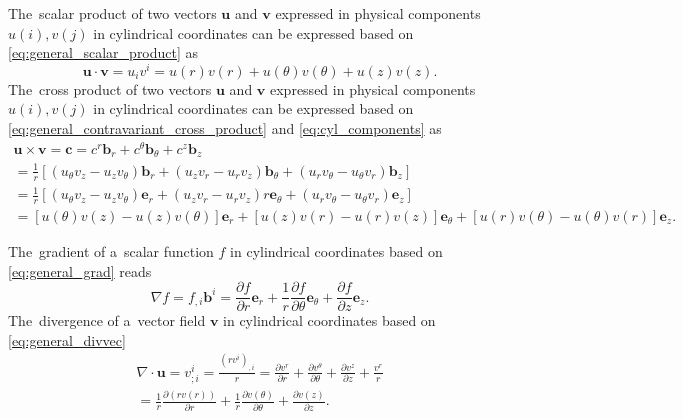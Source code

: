 \documentclass[preprint,12pt]{elsarticle}
\newcommand{\pdv}[2]{\frac{\partial{#1}}{\partial{#2}}}
\newcommand{\vect}[1]{\boldsymbol{#1}}
\newcounter{bla}
\begin{document}
The~scalar product of two vectors $\vect{u}$ and $\vect{v}$ expressed 
in physical components $u(i), v(j)$ in cylindrical coordinates can be expressed 
based on \eqref{eq:general_scalar_product} as
\begin{equation}
  \vect{u}\cdot\vect{v} = u_i v^i = u(r)v(r) + u(\theta)v(\theta) 
  + u(z)v(z) .
  \label{eq:cyl_scalar_product}
\end{equation}
The~cross product of two vectors $\vect{u}$ and $\vect{v}$ expressed 
in physical components $u(i), v(j)$ in cylindrical coordinates can be expressed 
based on \eqref{eq:general_contravariant_cross_product} 
and \eqref{eq:cyl_components} as
\begin{multline}
  \vect{u}\times\vect{v} = \vect{c} = c^r \vect{b}_r 
  + c^\theta \vect{b}_\theta + c^z \vect{b}_z \\
  = \frac{1}{r}\left[
  (u_\theta v_z - u_z v_\theta) \vect{b}_r 
  +  (u_z v_r - u_r v_z) \vect{b}_\theta
  +  (u_r v_\theta - u_\theta v_r)\vect{b}_z
  \right] \\
  = \frac{1}{r}\left[
  (u_\theta v_z - u_z v_\theta) \vect{e}_r 
  +  (u_z v_r - u_r v_z) r\vect{e}_\theta
  +  (u_r v_\theta - u_\theta v_r)\vect{e}_z
  \right] \\
 = [u(\theta) v(z) - u(z) v(\theta)] \vect{e}_r
 + [u(z) v(r) - u(r) v(z)] \vect{e}_\theta 
 + [u(r) v(\theta) - u(\theta) v(r)]\vect{e}_z .
 \label{eq:cyl_cross_product}
\end{multline}

The~gradient of a~scalar function $f$ in cylindrical coordinates based on 
\eqref{eq:general_grad} reads
\begin{equation}
  \nabla f = f_{,i}\vect{b}^i = \pdv{f}{r}\vect{e}_r 
  + \frac{1}{r}\pdv{f}{\theta}\vect{e}_{\theta} 
  + \pdv{f}{z}\vect{e}_z .
  \label{eq:cyl_gradf}
\end{equation}
The~divergence of a~vector field $\vect{v}$ in cylindrical coordinates based on
\eqref{eq:general_divvec}
\begin{multline}
  \nabla\cdot\vect{u} = v^i_{;i} = 
  \frac{(r v^i)_{,i}}{r}
  = \pdv{v^r}{r} + \pdv{v^\theta}{\theta} 
  + \pdv{v^z}{z} + \frac{v^r}{r} \\
  = \frac{1}{r}\pdv{(r v(r))}{r} + \frac{1}{r}\pdv{v(\theta)}{\theta} 
  + \pdv{v(z)}{z} .
  \label{eq:cyl_gradf}
\end{multline}
\end{document}
